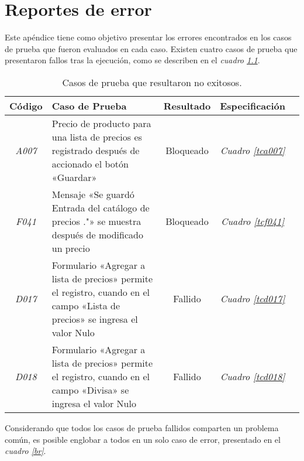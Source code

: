 \chapter{Reportes de error}\label{appendix_bugreport}
Este apéndice tiene como objetivo presentar los errores encontrados en los casos
de prueba que fueron evaluados en cada caso. Existen cuatro casos de prueba que
presentaron fallos tras la ejecución, como se describen en el
\emph{cuadro \ref{bugs}}.

\begin{table}
\centering
\begin{tabular}{|c|p{6.5cm}|c|c|c|}
\hline
\footnotesize{\textbf{Código}} & \footnotesize{\textbf{Caso de Prueba}} &
\footnotesize{\textbf{Resultado}} & \footnotesize{\textbf{Especificación}} \\
\hline
\footnotesize{\emph{A007}} &
\footnotesize{Precio de producto para una lista de precios es registrado después
de accionado el botón «Guardar»} &
\footnotesize{Bloqueado} &
\footnotesize{\emph{Cuadro \ref{tca007}}}
\\
\footnotesize{\emph{F041}} &
\footnotesize{Mensaje «Se guardó Entrada del catálogo de precios ."» se muestra
después de modificado un precio} &
\footnotesize{Bloqueado} &
\footnotesize{\emph{Cuadro \ref{tcf041}}}
\\
\footnotesize{\emph{D017}} &
\footnotesize{Formulario «Agregar a lista de precios» permite el registro,
cuando en el campo «Lista de precios» se ingresa el valor Nulo} &
\footnotesize{Fallido} &
\footnotesize{\emph{Cuadro \ref{tcd017}}}
\\
\footnotesize{\emph{D018}} &
\footnotesize{Formulario «Agregar a lista de precios» permite el registro,
cuando en el campo «Divisa» se ingresa el valor Nulo} &
\footnotesize{Fallido} &
\footnotesize{\emph{Cuadro \ref{tcd018}}}
\\
\hline
\end{tabular}
\caption{Casos de prueba que resultaron no exitosos.}
\label{bugs}
\end{table}

Considerando que todos los casos de prueba fallidos comparten un problema común,
es posible englobar a todos en un solo caso de error, presentado en el
\emph{cuadro \ref{br}}.


